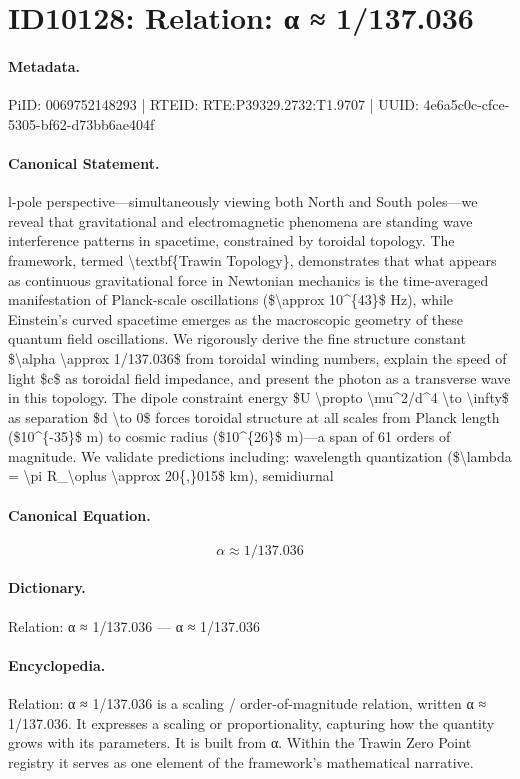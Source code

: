 \section*{ID10128: Relation: α ≈ 1/137.036}
\paragraph{Metadata.}
PiID: 0069752148293 | RTEID: RTE:P39329.2732:T1.9707 | UUID: 4e6a5c0c-cfce-5305-bf62-d73bb6ae404f

\paragraph{Canonical Statement.}
l-pole perspective---simultaneously viewing both North and South poles---we reveal that gravitational and electromagnetic phenomena are standing wave interference patterns in spacetime, constrained by toroidal topology. The framework, termed \textbackslash{}textbf\{Trawin Topology\}, demonstrates that what appears as continuous gravitational force in Newtonian mechanics is the time-averaged manifestation of Planck-scale oscillations (\$\textbackslash{}approx 10\textasciicircum{}\{43\}\$ Hz), while Einstein's curved spacetime emerges as the macroscopic geometry of these quantum field oscillations. We rigorously derive the fine structure constant \$\textbackslash{}alpha \textbackslash{}approx 1/137.036\$ from toroidal winding numbers, explain the speed of light \$c\$ as toroidal field impedance, and present the photon as a transverse wave in this topology. The dipole constraint energy \$U \textbackslash{}propto \textbackslash{}mu\textasciicircum{}2/d\textasciicircum{}4 \textbackslash{}to \textbackslash{}infty\$ as separation \$d \textbackslash{}to 0\$ forces toroidal structure at all scales from Planck length (\$10\textasciicircum{}\{-35\}\$ m) to cosmic radius (\$10\textasciicircum{}\{26\}\$ m)---a span of 61 orders of magnitude. We validate predictions including: wavelength quantization (\$\textbackslash{}lambda = \textbackslash{}pi R\_\textbackslash{}oplus \textbackslash{}approx 20\{,\}015\$ km), semidiurnal

\paragraph{Canonical Equation.}
\[
\alpha \approx 1/137.036
\]

\paragraph{Dictionary.}
Relation: α ≈ 1/137.036 — α ≈ 1/137.036

\paragraph{Encyclopedia.}
Relation: α ≈ 1/137.036 is a scaling / order-of-magnitude relation, written α ≈ 1/137.036. It expresses a scaling or proportionality, capturing how the quantity grows with its parameters. It is built from α. Within the Trawin Zero Point registry it serves as one element of the framework's mathematical narrative.
